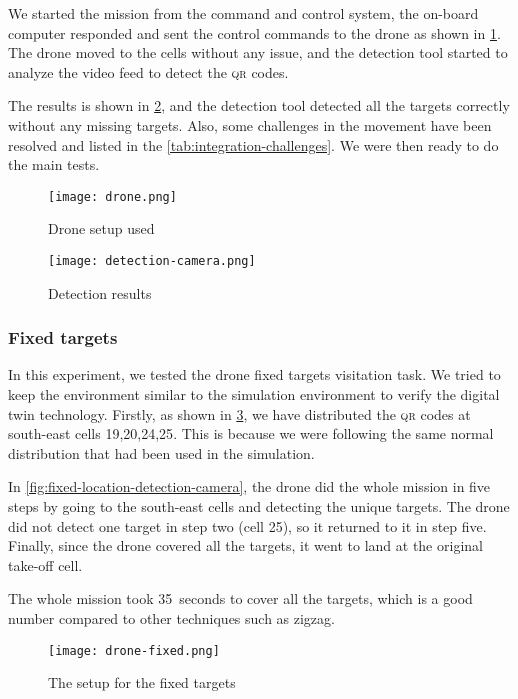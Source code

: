 \documentclass[../main.tex]{subfiles}
\begin{document}
We started the mission from the command and control system, 
the on-board computer responded and sent the control commands 
to the drone as shown in \cref{fig:experiment-drone}.
The drone moved to the cells without any issue,
and the detection tool started to analyze 
the video feed to detect the \textsc{qr} codes.

The results is shown in \cref{fig:detection-camera}, 
and the detection tool detected all the targets correctly 
without any missing targets. Also, some challenges 
in the movement have been resolved and listed in 
the \cref{tab:integration-challenges}. 
We were then ready to do the main tests.

\begin{figure}[H]
	\centering
	\texttt{[image: drone.png]}
	\caption{Drone setup used}
	\label{fig:experiment-drone}
\end{figure} 

\begin{figure}[H]
	\centering
	\texttt{[image: detection-camera.png]}
	\caption{Detection results}
	\label{fig:detection-camera}
\end{figure}

\subsubsection{Fixed targets}

In this experiment, we tested the drone fixed targets
visitation task. We tried to keep the environment similar
to the simulation environment to verify the digital twin technology.
Firstly, as shown in \cref{fig:targets-location},
we have distributed the \textsc{qr} codes at south-east cells 
{19,20,24,25}. This is because we were following 
the same normal distribution that had been used in the simulation.

In \cref{fig:fixed-location-detection-camera},
the drone did the whole mission in five steps by going
to the south-east cells and detecting the unique targets. 
The drone did not detect one target in 
step two (cell 25), so it returned to it in step five. Finally,
since the drone covered all the targets, it 
went to land at the original take-off cell.

The whole mission took \SI{35}{seconds} to cover all the targets,
which is a good number compared to other techniques such as zigzag.

\begin{figure}[H]
	\centering
	\texttt{[image: drone-fixed.png]}
	\caption{The setup for the fixed targets}
	\label{fig:targets-location}
\end{figure}
\end{document}

